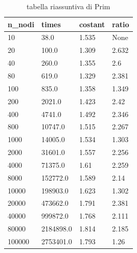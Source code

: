 \renewcommand{\arraystretch}{2}
\begin{longtable}[H]{|p{2cm}|p{3cm}|p{2cm}|p{3cm}|} 
\rowcolor{white}
\multicolumn{4}{c}{Continua alla pagina seguente...}
\endfoot
\rowcolor{white}
\caption{tabella riassuntiva di Prim}
\label{tab:tabellaPrim}
\endlastfoot
    \hline
    \rowcolor{lightgray}
    \textbf{n\_nodi} & \textbf{times} & \textbf{costant} & \textbf{ratio}\\ \hline\hline  \endhead
    10	&	38.0	&		1.535	&	None \\ \hline
    20	&	100.0	&		1.309	&	2.632 \\ \hline
    40	&	260.0	&		1.355 &		2.6     \\ \hline
    80	&	619.0	&		1.329 &		2.381  \\ \hline
    100	&	835.0	&		1.358 &		1.349 \\ \hline
    200	&	2021.0	&		1.423 &		2.42 \\ \hline
    400	&	4741.0	&		1.492 &		2.346 \\ \hline
    800	&	10747.0	&		1.515 &		2.267 \\ \hline
    1000 &	14005.0	&		1.534 &		1.303 \\ \hline
    2000 &	31601.0	&		1.557 &		2.256 \\ \hline
    4000 &	71375.0	&	    1.61 &		2.259 \\ \hline
    8000 &	152772.0 &		1.589 &		2.14 \\ \hline
    10000 &	198903.0 &		1.623 &		1.302 \\ \hline
    20000 &	473662.0 &		1.791 &		2.381 \\ \hline
    40000 &	999872.0 &		1.768 &		2.111 \\ \hline
    80000 &	2184898.0 &		1.814 &		2.185 \\ \hline
    100000 &	2753401.0 &	1.793 &		1.26 \\ \hline
\end{longtable}

\newpage

